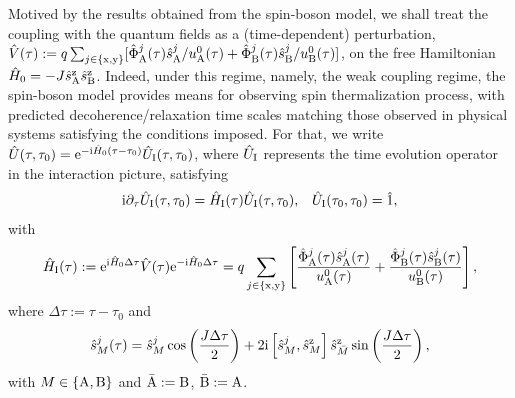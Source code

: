 \documentclass[]{nature}
\begin{document}
Motived by the results obtained from the spin-boson model\cite{leggett}, we shall treat the coupling with the quantum fields as a (time-dependent) 
perturbation, $ \hat V(\tau) :=q\sum_{j\in\{{\rm x},{\rm y}\}}  [\hat{\Phi}^j_{\rm A}(\tau) \hat{s}^j_{\rm A}/u_{\rm A}^0(\tau)+\hat{\Phi}^j_{\rm B}(\tau) \hat{s}^j_{\rm B}/u_{\rm B}^0(\tau)]$, 
on the free Hamiltonian $\hat{H}_0 = -J \hat{s}_{\rm A}^{\rm z} \hat{s}^{\rm z}_{\rm B}$. Indeed, under this regime, namely, the weak coupling regime, the spin-boson model provides means for observing spin thermalization process, with predicted decoherence/relaxation time scales matching those observed in physical systems satisfying the conditions imposed.  
For that, we write $\hat U(\tau,\tau_0) = {\rm e}^{-{\rm i}\hat H_0 (\tau-\tau_0)} \hat U_{\rm I}(\tau,\tau_0)$, where $\hat U_{\rm I}$ represents the time evolution operator in the interaction picture, satisfying
\begin{eqnarray}
{\rm i}\partial_\tau\hat{U}_{\rm I}(\tau,\tau_0)= \hat{H}_{\rm I}(\tau) \hat{U}_{\rm I}(\tau,\tau_0),\;\;\;\hat{U}_{\rm I}(\tau_0,\tau_0)= \hat 1,
\label{dUIdt}
\end{eqnarray}
with
\begin{eqnarray}
\hat{H}_{\rm I}(\tau) :={\rm e}^{{\rm i}\hat H_0 \Delta \tau} \hat V(\tau) {\rm e}^{-{\rm i}\hat H_0 \Delta \tau}
=q \sum_{j\in\{{\rm x},{\rm y}\}}\left[\frac{\hat{\Phi}^j_{\rm A}(\tau) \hat{s}^j_{\rm A}(\tau)}{u_{\rm A}^0(\tau)}+\frac{\hat{\Phi}^j_{\rm B}(\tau) \hat{s}^j_{\rm B}(\tau)}{u_{\rm B}^0(\tau)} \right],
\label{HI}
\end{eqnarray}
where  $\Delta \tau := \tau -\tau_0$ and
\begin{eqnarray}
 \hat s^j_{M}(\tau)
=\hat s^j_{M} \cos\left(\frac{J \Delta\tau}{2}\right)+2{\rm i}\left[ \hat s^j_{M},  \hat s^{\rm z}_{M}\right]\hat s^{\rm z}_{\bar {M}} \sin\left(\frac{J \Delta \tau}{2}\right),
\label{Had}
\end{eqnarray}
with $M\in \{{\rm A},{\rm B}\}$ and $\bar {\rm A} := {\rm B}$, $\bar {\rm B} := {\rm A}$.
\end{document}
